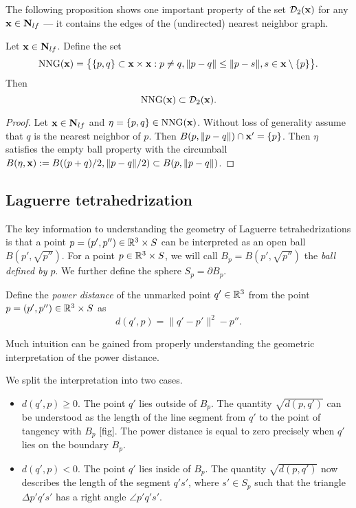 \noindent The following proposition shows one important property of the set $\mathcal D_2({\mathbf{x}})$ for any ${\mathbf{x}} \in \mathbf N_{lf}$ --- it contains the edges of the (undirected) nearest neighbor graph.
\begin{proposition}\label{prop:nng}
	Let ${\mathbf{x}}\in\mathbf N_{lf}$. Define the set
	$$\mathrm{NNG}({\mathbf{x}}) = \big\{ \{p,q\}\subset {\mathbf{x}} \times {\mathbf{x}}: p\neq q, \|p-q\| \leq \|p-s\|, s\in {\mathbf{x}}\setminus\{p\}  \big\}.$$
	Then 
	$$\mathrm{NNG}({\mathbf{x}}) \subset \mathcal D_2({\mathbf{x}}).$$
\end{proposition}
\begin{proof}
	Let ${\mathbf{x}}\in \mathbf N_{lf}$ and $\eta =\{p,q\} \in \mathrm{NNG}({\mathbf{x}})$. Without loss of generality assume that $q$ is the nearest neighbor of $p$. Then $ B(p,\|p-q\|)\cap {\mathbf{x}}' = \{p\}$. Then $\eta$ satisfies the empty ball property with the circumball $ B(\eta,{\mathbf{x}}) := B((p+q)/2,\|p-q\|/2) \subset B(p,\|p-q\|)$.
\end{proof}



\subsection{Laguerre tetrahedrization}\label{sec:Laguerre}

The key information to understanding the geometry of Laguerre tetrahedrizations is that a point $p=(p',p'')\in {\mathbb R^3}\times S$ can be interpreted as an open ball $B(p',\sqrt{p''})$. For a point $p\in {\mathbb R^3} \times S$, we will call $B_p = B(p',\sqrt{p''})$ the \textit{ball defined by $p$}. We further define the sphere $S_p=\partial B_p$. 


\begin{definition}
	Define the \textit{power distance} of the unmarked point $q'\in {\mathbb R^3}$ from the point $p=(p',p'')\in{\mathbb R^3}\times S$ as
	$$d(q',p) = \|q'-p'\|^2 - p''.$$
\end{definition}
Much intuition can be gained from properly understanding the geometric interpretation of the power distance.

\begin{remark}
	We split the interpretation into two cases. 
\begin{itemize}
	\item $d(q',p) \geq 0$. The point $q'$ lies outside of $B_p$. The quantity $\sqrt{d(p,q')}$ can be understood as the length of the line segment from $q'$ to the point of tangency with $B_p$ [fig]. The power distance is equal to zero precisely when $q'$ lies on the boundary $B_p$.
	\item $d(q',p) < 0$. The point $q'$ lies inside of $B_p$. The quantity $\sqrt{d(p,q')}$ now describes the length of the segment $q's'$, where $s' \in S_p$ such that the triangle $\Delta p'q's'$ has a right angle $\angle p'q's'$. 
\end{itemize}
\end{remark}

